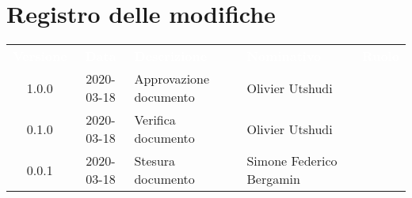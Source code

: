 \section*{Registro delle modifiche}
{
	\centering
	\begin{longtable}{ c c  C{4cm} C{4cm} C{3cm} }
		\textcolor{white}{\textbf{Versione}} & \textcolor{white}{\textbf{Data}} & \textcolor{white}{\textbf{Descrizione}} & \textcolor{white}{\textbf{Nominativo}} & \textcolor{white}{\textbf{Ruolo}}\\		
		1.0.0 & 2020-03-18 & Approvazione documento & Olivier Utshudi &\RdP{}\\		
		0.1.0 & 2020-03-18 & Verifica documento & Olivier Utshudi &\ver{}\\		
		0.0.1 & 2020-03-18 & Stesura documento & Simone Federico Bergamin &\reda{}\\		
		
	\end{longtable}

}